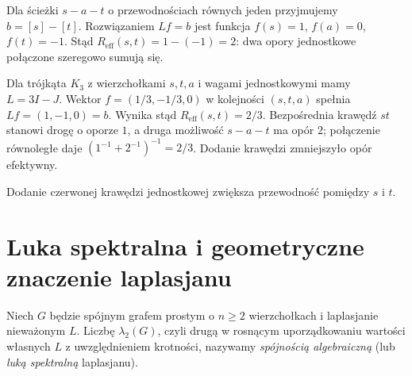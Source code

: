 \begin{przyklad}
Dla ścieżki $s-a-t$ o przewodnościach równych jeden
przyjmujemy $b=[s]-[t]$. Rozwiązaniem $Lf=b$
jest funkcja $f(s)=1$, $f(a)=0$, $f(t)=-1$.
Stąd $R_{\mathrm{eff}}(s,t)=1-(-1)=2$:
dwa opory jednostkowe połączone szeregowo sumują się.

Dla trójkąta $K_3$ z wierzchołkami $s,t,a$
i wagami jednostkowymi mamy $L=3I-J$.
Wektor $f=(1/3,-1/3,0)$ w kolejności $(s,t,a)$
spełnia $Lf=(1,-1,0)=b$.
Wynika stąd
$R_{\mathrm{eff}}(s,t)=2/3$.
Bezpośrednia krawędź $st$ stanowi drogę o oporze $1$,
a druga możliwość $s-a-t$ ma opór $2$;
połączenie równoległe daje $(1^{-1}+2^{-1})^{-1}=2/3$.
Dodanie krawędzi zmniejszyło opór efektywny.
\end{przyklad}

\begin{center}

{\footnotesize Dodanie czerwonej krawędzi jednostkowej
zwiększa przewodność pomiędzy $s$ i $t$.}
\end{center}


\newpage
\section{Luka spektralna i geometryczne znaczenie laplasjanu}
\label{sec:tg-spectral-gap}

\begin{definicja}
Niech $G$ będzie spójnym grafem prostym o $n\ge2$
wierzchołkach i laplasjanie nieważonym $L$.
Liczbę $\lambda_2(G)$, czyli drugą w rosnącym uporządkowaniu
wartości własnych $L$ z uwzględnieniem krotności, nazywamy \emph{spójnością algebraiczną}
(lub \emph{luką spektralną} laplasjanu).
\end{definicja}

